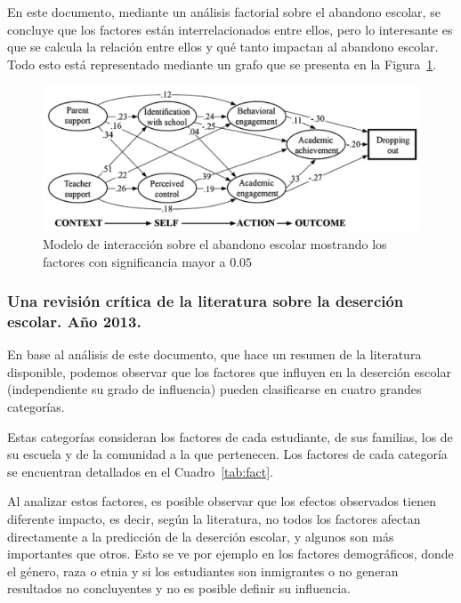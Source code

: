 En este documento, mediante un análisis factorial sobre el abandono escolar, se concluye que los factores están interrelacionados entre ellos, pero lo interesante es que se calcula la relación entre ellos y qué tanto impactan al abandono escolar. Todo esto está representado mediante un grafo que se presenta en la Figura~\ref{fig:domodel}.

\begin{figure}[H]
  \centering
    \includegraphics[width=1\textwidth]{Figuras/dropoutmodel}
      \caption{Modelo de interacción sobre el abandono escolar mostrando los factores con significancia mayor a $0.05$\cite{hsdropout}}
    \label{fig:domodel}
\end{figure}

\subsubsection{Una revisión crítica de la literatura sobre la deserción escolar. Año 2013.}

En base al análisis de este documento, que hace un resumen de la literatura disponible, podemos observar que los factores que influyen en la deserción escolar (independiente su grado de influencia) pueden clasificarse en cuatro grandes categorías. 

Estas categorías consideran los factores de cada estudiante, de sus familias, los de su escuela y de la comunidad a la que pertenecen. Los factores de cada categoría se encuentran detallados en el Cuadro~\ref{tab:fact}.

Al analizar estos factores, es posible observar que los efectos observados tienen diferente impacto, es decir, según la literatura, no todos los factores afectan directamente a la predicción de la deserción escolar, y algunos son más importantes que otros. Esto se ve por ejemplo en los factores demográficos, donde el género, raza o etnia y si los estudiantes son inmigrantes o no generan resultados no concluyentes y no es posible definir su influencia.

